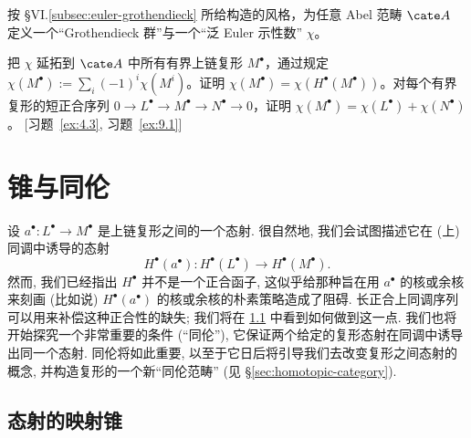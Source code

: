 \begin{prob}\label{ex:3.15}
按 §VI.\ref{subsec:euler-grothendieck} 所给构造的风格，为任意 Abel 范畴 $\cate A$ 定义一个“Grothendieck 群”与一个“泛 Euler 示性数” $\chi$。

把 $\chi$ 延拓到 $\cate A$ 中所有有界上链复形 $M^\bullet$，通过规定 $\chi(M^\bullet):=\sum_i(-1)^i\chi(M^i)$。证明 $\chi(M^\bullet)=\chi(H^\bullet(M^\bullet))$。对每个有界复形的短正合序列 $0\to L^\bullet\to M^\bullet\to N^\bullet\to 0$，证明 $\chi(M^\bullet)=\chi(L^\bullet)+\chi(N^\bullet)$。 [习题~\ref{ex:4.3}, 习题~\ref{ex:9.1}]
\end{prob}


\section{锥与同伦}
\label{sec:cones-homotopies}

设 $a^\bullet : L^\bullet \to M^\bullet$ 是上链复形之间的一个态射. 很自然地, 我们会试图描述它在 (上) 同调中诱导的态射
\[
H^\bullet(a^\bullet): H^\bullet(L^\bullet)\longrightarrow H^\bullet(M^\bullet).
\]
然而, 我们已经指出 $H^\bullet$ 并不是一个正合函子, 这似乎给那种旨在用 $a^\bullet$ 的核或余核来刻画 (比如说) $H^\bullet(a^\bullet)$ 的核或余核的朴素策略造成了阻碍. 长正合上同调序列可以用来补偿这种正合性的缺失; 我们将在 \ref{subsec:4.1-mapping-cone} 中看到如何做到这一点. 我们也将开始探究一个非常重要的条件 (``同伦''), 它保证两个给定的复形态射在同调中诱导出同一个态射. 同伦将如此重要, 以至于它日后将引导我们去改变复形之间态射的概念, 并构造复形的一个新``同伦范畴'' (见 \S\ref{sec:homotopic-category}).

\subsection{态射的映射锥}
\label{subsec:4.1-mapping-cone}

